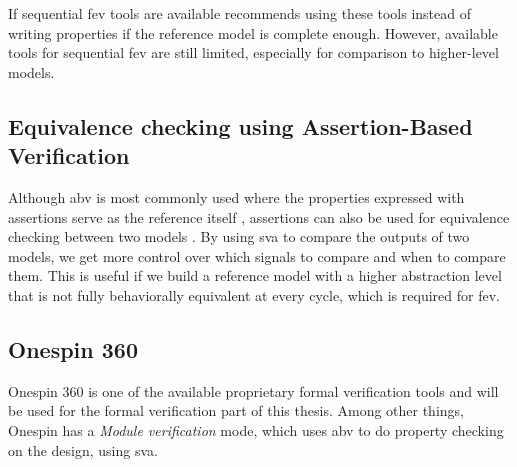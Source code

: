 If sequential \acrshort{fev} tools are available \textcite{seligmanFormalVerificationEssential2015} recommends using these tools instead of writing properties if the reference model is complete enough. However, available tools for sequential \acrshort{fev} are still limited, especially for comparison to higher-level models.

\subsection{Equivalence checking using Assertion-Based Verification}
\label{sec:bg_eq_abv}

Although \acrshort{abv} is most commonly used where the properties expressed with assertions serve as the reference itself \cite{seligmanFormalVerificationEssential2015}, assertions can also be used for equivalence checking between two models \cite{kumarEquivalenceCheckingUsing2015}. By using \acrshort{sva} to compare the outputs of two models, we get more control over which signals to compare and when to compare them. This is useful if we build a reference model with a higher abstraction level that is not fully behaviorally equivalent at every cycle, which is required for \acrshort{fev}.


\subsection{Onespin 360}

Onespin 360 \cite{onespinsolutionsgmbhUserManualOneSpin} is one of the available proprietary formal verification tools and will be used for the formal verification part of this thesis. Among other things, Onespin has a \textit{Module verification} mode, which uses \acrshort{abv} to do property checking on the design, using \acrfull{sva}.




